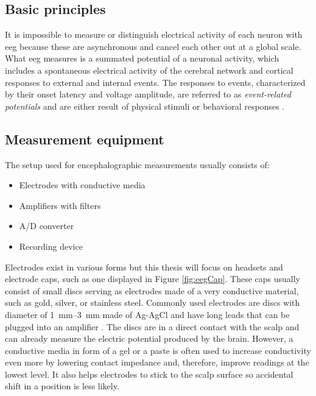 \subsection{Basic principles}
It is impossible to measure or distinguish electrical activity of each neuron
with \gls{eeg} because these are asynchronous and cancel each other out at a global scale. 
What \gls{eeg} measures is a summated potential of a neuronal activity, which includes
a spontaneous electrical activity of the cerebral network and cortical responses to
external and internal events. The responses to events, characterized by their
onset latency and voltage amplitude, are referred to as \emph{event-related
potentials} and are either result of physical stimuli or behavioral responses \cite{bcComm}.

\subsection{Measurement equipment}
The setup used for encephalographic measurements usually consists of: 
\begin{itemize}
  \item Electrodes with conductive media
  \item Amplifiers with filters
  \item A/D converter
  \item Recording device
\end{itemize}
Electrodes exist in various forms but this thesis will focus on
headsets and electrode caps, such as one displayed in Figure \ref{fig:eegCap}.
These caps usually consist of small discs serving as electrodes made
of a very conductive material, such as gold, silver, or stainless steel. Commonly
used electrodes are discs with diameter of \SIrange[range-units
= single]{1}{3}{\mm} made of Ag-AgCl and have long leads that can be plugged into an
amplifier \cite{eegFund}. The discs are in a direct contact with the scalp and can already
measure the electric potential produced by the brain. However, a conductive media in form of a
gel or a paste is often used to increase conductivity even more by lowering
contact impedance and, therefore, improve readings at the lowest level. It also helps
electrodes to stick to the scalp surface so accidental shift in a position is less likely.

